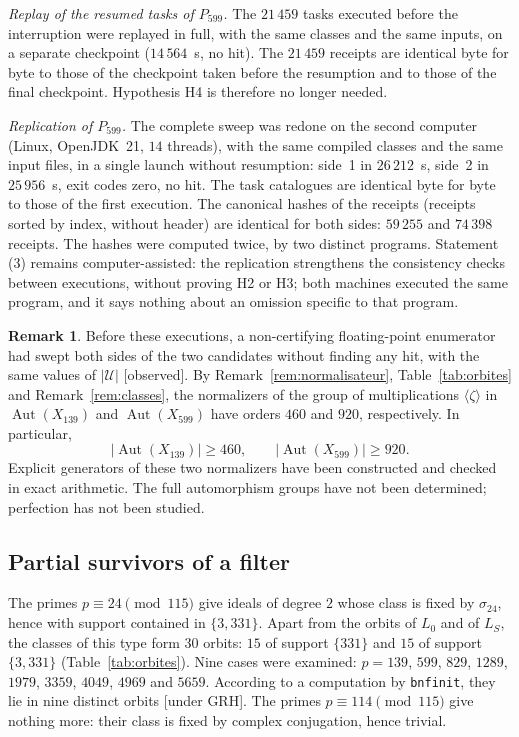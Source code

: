 \documentclass[11pt,a4paper]{amsart}
\theoremstyle{plain}
\theoremstyle{definition}
\newtheorem{remark}[theorem]{Remark}
\numberwithin{equation}{section}
\newcommand{\Uc}{\mathcal{U}}
\DeclareMathOperator{\Aut}{Aut}
\newcommand{\Lz}{L_{0}}
\newcommand{\LS}{L_{S}}
\newcommand{\st}[1]{\textup{\textsf{\small[#1]}}}
\newcommand{\GRH}{\st{under GRH}}
\newcommand{\CONS}{\st{observed}}
\begin{document}
\emph{Replay of the resumed tasks of $P_{599}$.} The $21\,459$ tasks executed before the interruption were replayed in full, with the same classes and the same inputs, on a separate checkpoint ($14\,564$~s, no hit). The $21\,459$ receipts are identical byte for byte to those of the checkpoint taken before the resumption and to those of the final checkpoint. Hypothesis H4 is therefore no longer needed.

\emph{Replication of $P_{599}$.} The complete sweep was redone on the second computer (Linux, OpenJDK~21, $14$ threads), with the same compiled classes and the same input files, in a single launch without resumption: side~1 in $26\,212$~s, side~2 in $25\,956$~s, exit codes zero, no hit. The task catalogues are identical byte for byte to those of the first execution. The canonical hashes of the receipts (receipts sorted by index, without header) are identical for both sides: $59\,255$ and $74\,398$ receipts. The hashes were computed twice, by two distinct programs. Statement (3) remains computer-assisted: the replication strengthens the consistency checks between executions, without proving H2 or H3; both machines executed the same program, and it says nothing about an omission specific to that program.

\begin{remark}
Before these executions, a non-certifying floating-point enumerator had swept both sides of the two candidates without finding any hit, with the same values of $|\Uc|$ \CONS. By Remark~\ref{rem:normalisateur}, Table~\ref{tab:orbites}
and Remark~\ref{rem:classes}, the normalizers of the group of
multiplications $\langle\zeta\rangle$ in $\Aut(X_{139})$ and
$\Aut(X_{599})$ have orders $460$ and $920$, respectively.
In particular,
\[
|\Aut(X_{139})|\ge460,\qquad |\Aut(X_{599})|\ge920.
\]
Explicit generators of these two normalizers have been constructed
and checked in exact arithmetic. The full automorphism groups
have not been determined; perfection has not been studied.
\end{remark}

\subsection{Partial survivors of a filter}\label{subsec:survivants}

The primes $p\equiv24\pmod{115}$ give ideals of degree $2$ whose class is fixed by $\sigma_{24}$, hence with support contained in $\{3,331\}$. Apart from the orbits of $\Lz$ and of $\LS$, the classes of this type form $30$ orbits: $15$ of support $\{331\}$ and $15$ of support $\{3,331\}$ (Table~\ref{tab:orbites}). Nine cases were examined: $p=139$, $599$, $829$, $1289$, $1979$, $3359$, $4049$, $4969$ and $5659$. According to a computation by \texttt{bnfinit}, they lie in nine distinct orbits \GRH. The primes $p\equiv114\pmod{115}$ give nothing more: their class is fixed by complex conjugation, hence trivial.
\end{document}
